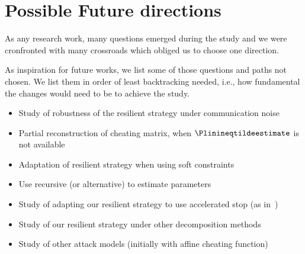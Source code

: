 \documentclass[../main.tex]{subfiles}
\begin{document}
\section{Possible Future directions}
As any research work, many questions emerged during the study and we were cronfronted with many crossroads which obliged us to choose one direction.

As inspiration for future works, we list some of those questions and paths not chosen. We list them in order of least backtracking needed, i.e., how fundamental the changes would need to be to achieve the study.
\begin{itemize}
  \item Study of robustness of the resilient strategy under communication noise
  \item Partial reconstruction of cheating matrix, when $\Plinineqtildeestimate$ is not available
  \item Adaptation of resilient strategy when using soft constraints~\cite{AlessioBemporad2009}
  \item Use recursive \EM{} (or alternative) to estimate parameters
  \item Study of adapting our resilient strategy to use accelerated stop (as in~\cite{DaiEtAl2017})
  \item Study of our resilient strategy under other decomposition methods
  \item Study of other attack models (initially with affine cheating function)
\end{itemize}
\end{document}

